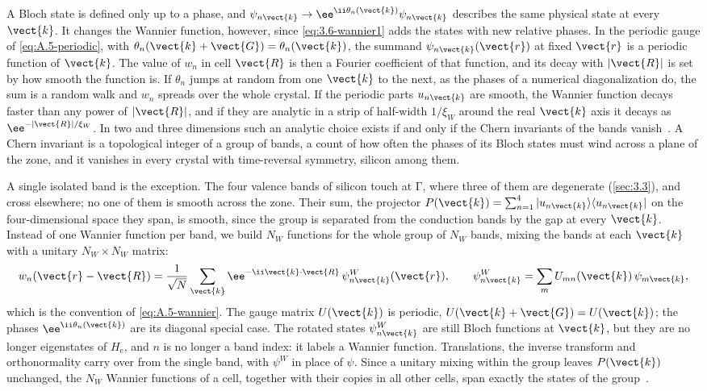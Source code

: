 A Bloch state is defined only up to a phase, and $\psi_{n\vect{k}} \to \ee^{\ii\theta_n(\vect{k})}\psi_{n\vect{k}}$ describes the same physical state at every $\vect{k}$. It changes the Wannier function, however, since \cref{eq:3.6-wannier1} adds the states with new relative phases. In the periodic gauge of \cref{eq:A.5-periodic}, with $\theta_n(\vect{k} + \vect{G}) = \theta_n(\vect{k})$, the summand $\psi_{n\vect{k}}(\vect{r})$ at fixed $\vect{r}$ is a periodic function of $\vect{k}$. The value of $w_n$ in cell $\vect{R}$ is then a Fourier coefficient of that function, and its decay with $|\vect{R}|$ is set by how smooth the function is. If $\theta_n$ jumps at random from one $\vect{k}$ to the next, as the phases of a numerical diagonalization do, the sum is a random walk and $w_n$ spreads over the whole crystal. If the periodic parts $u_{n\vect{k}}$ are smooth, the Wannier function decays faster than any power of $|\vect{R}|$, and if they are analytic in a strip of half-width $1/\xi_W$ around the real $\vect{k}$ axis it decays as $\ee^{-|\vect{R}|/\xi_W}$. In two and three dimensions such an analytic choice exists if and only if the Chern invariants of the bands vanish~\cite{brouder2007exponential}. A Chern invariant is a topological integer of a group of bands, a count of how often the phases of its Bloch states must wind across a plane of the zone, and it vanishes in every crystal with time-reversal symmetry, silicon among them.

A single isolated band is the exception. The four valence bands of silicon touch at $\mathrm{\Gamma}$, where three of them are degenerate (\cref{sec:3.3}), and cross elsewhere; no one of them is smooth across the zone. Their sum, the projector $P(\vect{k}) = \sum_{n=1}^{4}|u_{n\vect{k}}\rangle\langle u_{n\vect{k}}|$ on the four-dimensional space they span, is smooth, since the group is separated from the conduction bands by the gap at every $\vect{k}$. Instead of one Wannier function per band, we build $N_W$ functions for the whole group of $N_W$ bands, mixing the bands at each $\vect{k}$ with a unitary $N_W\times N_W$ matrix:
\begin{equation}
  w_n(\vect{r} - \vect{R}) = \frac{1}{\sqrt N}\sum_{\vect{k}}\ee^{-\ii\vect{k}\cdot\vect{R}}\,\psi^W_{n\vect{k}}(\vect{r}), \qquad
  \psi^W_{n\vect{k}} = \sum_m U_{mn}(\vect{k})\,\psi_{m\vect{k}} ,
  \label{eq:3.6-wannier}
\end{equation}
which is the convention of \cref{eq:A.5-wannier}. The gauge matrix $U(\vect{k})$ is periodic, $U(\vect{k} + \vect{G}) = U(\vect{k})$; the phases $\ee^{\ii\theta_n(\vect{k})}$ are its diagonal special case. The rotated states $\psi^W_{n\vect{k}}$ are still Bloch functions at $\vect{k}$, but they are no longer eigenstates of $H_{\mathrm{e}}$, and $n$ is no longer a band index: it labels a Wannier function. Translations, the inverse transform and orthonormality carry over from the single band, with $\psi^W$ in place of $\psi$. Since a unitary mixing within the group leaves $P(\vect{k})$ unchanged, the $N_W$ Wannier functions of a cell, together with their copies in all other cells, span exactly the states of the group~\cite[Eqs.~(8)--(10)]{marzari2012maximally}.

